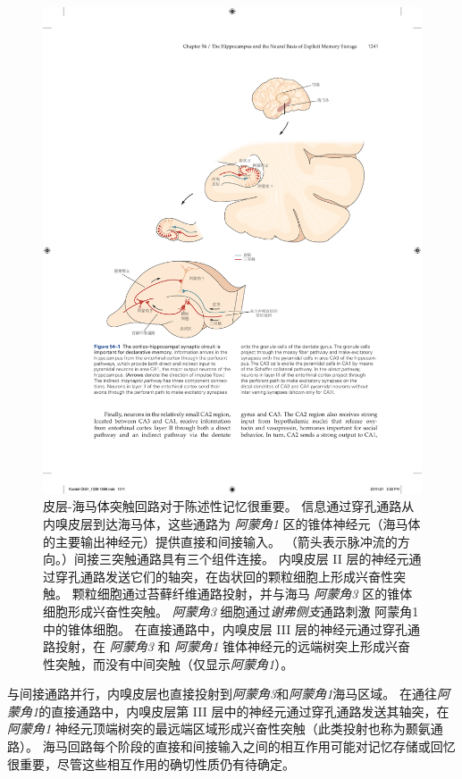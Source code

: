 \begin{figure}[htbp]
	\centering
	\includegraphics[width=0.9\linewidth]{chap54/fig_54_1}
	\caption{皮层-海马体突触回路对于陈述性记忆很重要。
		信息通过穿孔通路从内嗅皮层到达海马体，这些通路为 \textit{阿蒙角1} 区的锥体神经元（海马体的主要输出神经元）提供直接和间接输入。
		（箭头表示脉冲流的方向。）间接三突触通路具有三个组件连接。
		内嗅皮层 II 层的神经元通过穿孔通路发送它们的轴突，在齿状回的颗粒细胞上形成兴奋性突触。
		颗粒细胞通过苔藓纤维通路投射，并与海马 \textit{阿蒙角3} 区的锥体细胞形成兴奋性突触。
		\textit{阿蒙角3} 细胞通过\textit{谢弗侧支}通路刺激 阿蒙角1 中的锥体细胞。
		在直接通路中，内嗅皮层 III 层的神经元通过穿孔通路投射，在 \textit{阿蒙角3} 和 \textit{阿蒙角1} 锥体神经元的远端树突上形成兴奋性突触，而没有中间突触（仅显示\textit{阿蒙角1}）。}
	\label{fig:54_1}
\end{figure}


与间接通路并行，内嗅皮层也直接投射到\textit{阿蒙角3}和\textit{阿蒙角1}海马区域。
在通往\textit{阿蒙角1}的直接通路中，内嗅皮层第 III 层中的神经元通过穿孔通路发送其轴突，在\textit{阿蒙角1} 神经元顶端树突的最远端区域形成兴奋性突触（此类投射也称为颞氨通路）。
海马回路每个阶段的直接和间接输入之间的相互作用可能对记忆存储或回忆很重要，尽管这些相互作用的确切性质仍有待确定。


